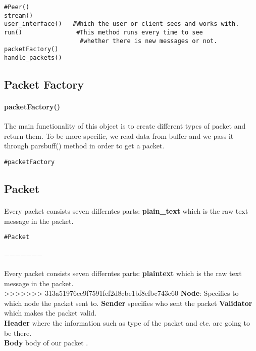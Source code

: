 \documentclass{article}
\begin{document}
\begin{lstlisting}
#Peer()
stream()
user_interface()   #Which the user or client sees and works with. 
run() 				#This method runs every time to see 
				     #whether there is new messages or not.
packetFactory()
handle_packets()
\end{lstlisting}
\subsection{Packet Factory}
\paragraph{packetFactory()}The main functionality of this object is to create different types of packet and return them. To be more specific, we read data from buffer and we pass it through pars\underline{\hspace{.05in}}buff() method in order to get a packet.
\begin{lstlisting}
#packetFactory
\end{lstlisting}
\subsection{Packet}

\paragraph{}Every packet consists seven differntes parts: \textbf{plain\_text} which is the raw text message in the packet.\\
\begin{lstlisting}
#Packet

\end{lstlisting}
=======
\paragraph{}Every packet consists seven differntes parts: \textbf{plain\underline{\hspace{.05in}}text} which is the raw text message in the packet.\\
>>>>>>> 313a51976ec9f7591fef2d8cbe1bf8efbc743e60
\textbf{Node}: Specifies to which node the packet sent to. \textbf{Sender} specifies who sent the packet \textbf{Validator} which makes the packet valid.\\ \textbf{Header} where the information such as type of the packet and etc. are going to be there.\\ \textbf{Body} body of our packet .
\end{document}
